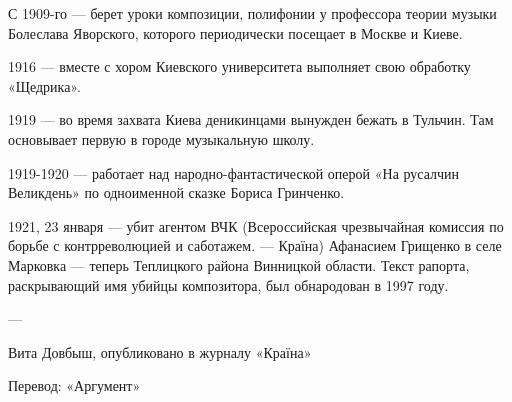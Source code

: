 С 1909-го — берет уроки композиции, полифонии у профессора теории музыки
Болеслава Яворского, которого периодически посещает в Москве и Киеве.

1916 — вместе с хором Киевского университета выполняет свою обработку
«Щедрика».

1919 — во время захвата Киева деникинцами вынужден бежать в Тульчин. Там
основывает первую в городе музыкальную школу.

1919-1920 — работает над народно-фантастической оперой «На русалчин Великдень»
по одноименной сказке Бориса Гринченко.

1921, 23 января — убит агентом ВЧК (Всероссийская чрезвычайная комиссия по
борьбе с контрреволюцией и саботажем. — Країна) Афанасием Грищенко в селе
Марковка — теперь Теплицкого района Винницкой области. Текст рапорта,
раскрывающий имя убийцы композитора, был обнародован в 1997 году.

—

Вита Довбыш, опубликовано в журналу «Країна»

Перевод: «Аргумент»
